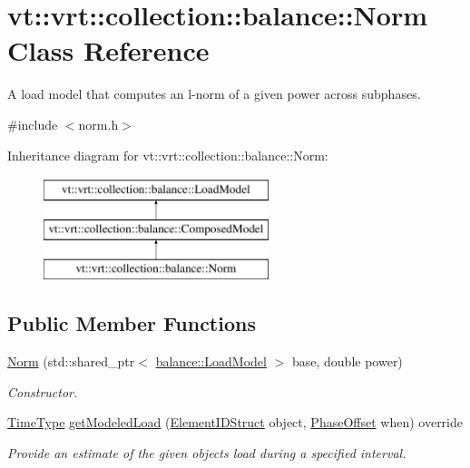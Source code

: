 \hypertarget{classvt_1_1vrt_1_1collection_1_1balance_1_1_norm}{}\section{vt\+:\+:vrt\+:\+:collection\+:\+:balance\+:\+:Norm Class Reference}
\label{classvt_1_1vrt_1_1collection_1_1balance_1_1_norm}


A load model that computes an l-\/norm of a given power across subphases.  




{\ttfamily \#include $<$norm.\+h$>$}

Inheritance diagram for vt\+:\+:vrt\+:\+:collection\+:\+:balance\+:\+:Norm\+:\begin{figure}[H]
\begin{center}
\leavevmode
\includegraphics[height=3.000000cm]{classvt_1_1vrt_1_1collection_1_1balance_1_1_norm}
\end{center}
\end{figure}
\subsection*{Public Member Functions}
\begin{DoxyCompactItemize}
\item 
\hyperlink{classvt_1_1vrt_1_1collection_1_1balance_1_1_norm_a054625ebe2a8dcd9f986f36f40b70ada}{Norm} (std\+::shared\+\_\+ptr$<$ \hyperlink{structvt_1_1vrt_1_1collection_1_1balance_1_1_load_model}{balance\+::\+Load\+Model} $>$ base, double power)
\begin{DoxyCompactList}\small\item\em Constructor. \end{DoxyCompactList}\item 
\hyperlink{namespacevt_a876a9d0cd5a952859c72de8a46881442}{Time\+Type} \hyperlink{classvt_1_1vrt_1_1collection_1_1balance_1_1_norm_a21d3b7c8c315037baee991f65d0dabac}{get\+Modeled\+Load} (\hyperlink{namespacevt_1_1vrt_1_1collection_1_1balance_a9f5b53fafb270212279a4757d2c4cd28}{Element\+I\+D\+Struct} object, \hyperlink{structvt_1_1vrt_1_1collection_1_1balance_1_1_phase_offset}{Phase\+Offset} when) override
\begin{DoxyCompactList}\small\item\em Provide an estimate of the given object\textquotesingle{}s load during a specified interval. \end{DoxyCompactList}\end{DoxyCompactItemize}
